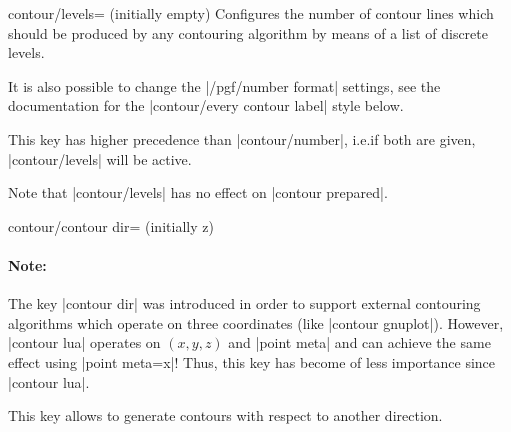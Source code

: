 {{\begin{pgfplotskey}{contour/levels= (initially empty)}
    Configures the number of contour lines which should be produced by any
    contouring algorithm by means of a list of discrete levels.
\pgfplotsexpensiveexample
\begin{codeexample}[]
\end{codeexample}
    It is also possible to change the |/pgf/number format| settings, see the
    documentation for the |contour/every contour label| style below.

    This key has higher precedence than |contour/number|, i.e.\@ if both are
    given, |contour/levels| will be active.

    Note that |contour/levels| has no effect on |contour prepared|.
\end{pgfplotskey}

\begin{pgfplotskey}{contour/contour dir= (initially z)}
	\paragraph{Note:} The key |contour dir| was introduced in order to support external contouring algorithms which operate on three coordinates (like |contour gnuplot|). However, |contour lua| operates on $(x,y,z)$ and |point meta| and can achieve the same effect using |point meta=x|! Thus, this key has become of less importance since |contour lua|.

    This key allows to generate contours with respect to another direction.
\pgfplotsexpensiveexample
\begin{codeexample}[]
\end{codeexample}



\end{pgfplotskey}}}
